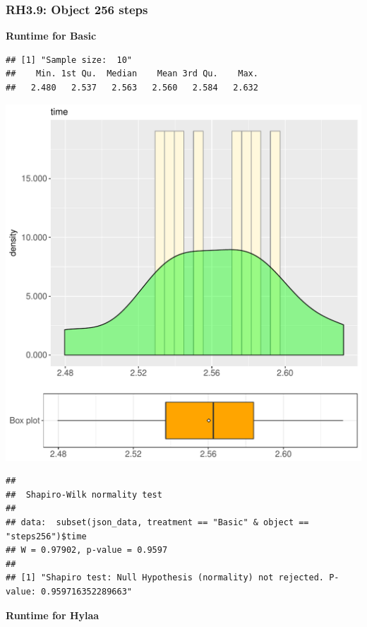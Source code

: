 \documentclass{article}\usepackage[]{graphicx}\usepackage[]{color}
\makeatletter
\def\maxwidth{ %
  \ifdim\Gin@nat@width>\linewidth
    \linewidth
  \else
    \Gin@nat@width
  \fi
}
\newenvironment{kframe}{%
 \def\at@end@of@kframe{}%
 \ifinner\ifhmode%
  \def\at@end@of@kframe{\end{minipage}}%
  \begin{minipage}{\columnwidth}%
 \fi\fi%
 \def\FrameCommand##1{\hskip\@totalleftmargin \hskip-\fboxsep
 \colorbox{shadecolor}{##1}\hskip-\fboxsep
     \hskip-\linewidth \hskip-\@totalleftmargin \hskip\columnwidth}%
 \MakeFramed {\advance\hsize-\width
   \@totalleftmargin\z@ \linewidth\hsize
   \@setminipage}}%
 {\par\unskip\endMakeFramed%
 \at@end@of@kframe}
\newenvironment{knitrout}{}{} %
\makeatother
\begin{document}
\subsubsection{RH3.9: Object 256 steps}

 \textbf{Runtime for Basic}
\begin{knitrout}
\color{fgcolor}\begin{kframe}
\begin{verbatim}
## [1] "Sample size:  10"
##    Min. 1st Qu.  Median    Mean 3rd Qu.    Max. 
##   2.480   2.537   2.563   2.560   2.584   2.632
\end{verbatim}
\end{kframe}
\includegraphics[width=\maxwidth]{figure/RH3_Basic_steps256-1} 
\begin{kframe}\begin{verbatim}
## 
## 	Shapiro-Wilk normality test
## 
## data:  subset(json_data, treatment == "Basic" & object == "steps256")$time
## W = 0.97902, p-value = 0.9597
## 
## [1] "Shapiro test: Null Hypothesis (normality) not rejected. P-value: 0.959716352289663"
\end{verbatim}
\end{kframe}
\end{knitrout}
 \textbf{Runtime for Hylaa}
\end{document}
